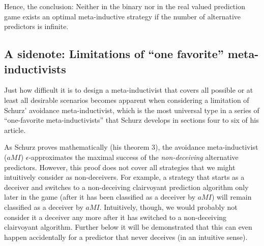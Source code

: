 \documentclass[12pt, a4paper]{article}
\numberwithin{equation}{section}
\begin{document}

Hence, the conclusion: Neither in the binary nor in the real
valued prediction game exists an optimal meta-inductive strategy if the
number of alternative predictors is infinite.

\subsection{A sidenote: Limitations of ``one favorite'' meta-inductivists}

Just how difficult it is to design a meta-inductivist that covers all possible
or at least all desirable scenarios becomes apparent when considering
a limitation of Schurz' avoidance meta-inductivist, which is the most universal
type in a series of ``one-favorite meta-inductivists'' that Schurz develops in
sections four to six of his article. 

As Schurz proves mathematically (his theorem 3), the avoidance
meta-inductivist ($aMI$) $\epsilon$-approximates the maximal success of
the {\em non-deceiving} alternative predictors. However, this proof
does not cover all strategies that we might intuitively consider as
non-deceivers. For example, a strategy that starts as a deceiver and
switches to a non-deceiving clairvoyant prediction algorithm only later
in the game (after it has been classified as a deceiver by $aMI$) will
remain classified as a deceiver by $aMI$. Intuitively, though, we would
probably not consider it a deceiver any more after it has switched to a
non-deceiving clairvoyant algorithm. Further below it will be
demonstrated that this can even happen accidentally for a predictor that
never deceives (in an intuitive sense).
\end{document}
